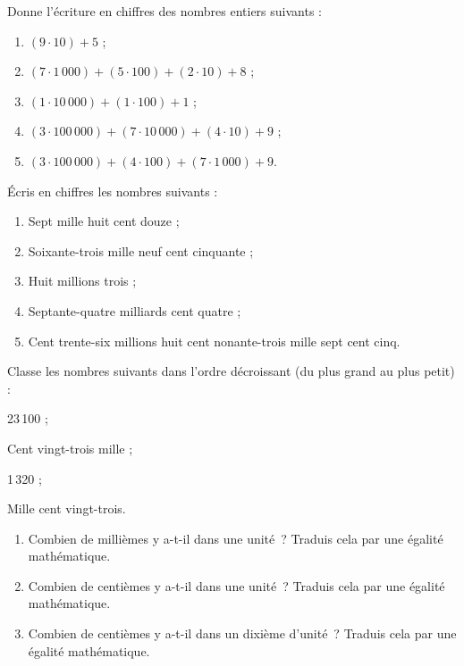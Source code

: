 \begin{exercice}
Donne l'écriture en chiffres des nombres entiers suivants :
\begin{enumerate}
 \item $(9 \cdot 10) + 5$ ;
 \item $(7 \cdot 1\,000) + (5 \cdot 100) + (2 \cdot 10) + 8$ ;
 \item $(1 \cdot 10\,000) + (1 \cdot 100) + 1$ ;
 \item  $(3 \cdot 100\,000) + (7 \cdot 10\,000) + (4 \cdot 10) + 9$ ;
 \item  $(3 \cdot 100\,000) + (4 \cdot 100) + (7 \cdot 1\,000) + 9$.
 \end{enumerate}
\end{exercice}


\begin{exercice}
Écris en chiffres les nombres suivants :
\begin{enumerate}
 \item Sept mille huit cent douze ;
 \item Soixante-trois mille neuf cent cinquante ;
 \item Huit millions trois ;
 \item Septante-quatre milliards cent quatre ;
 \item Cent trente-six millions huit cent nonante-trois mille sept cent cinq.
 \end{enumerate}
\end{exercice}

\vspace{1em}%

\begin{exercice}
Classe les nombres suivants dans l'ordre décroissant (du plus grand au plus petit) :
\begin{colitemize}{2}
 \item 23\,100 ;
 \item Cent vingt-trois mille ;
 \item 1\,320 ;
 \item Mille cent vingt-trois.
 \end{colitemize}
\end{exercice}



\begin{exercice}
\begin{enumerate}
 \item Combien de millièmes y a-t-il dans une unité ?
Traduis cela par une égalité mathématique.
 \item Combien de centièmes y a-t-il dans une unité ? Traduis cela par une égalité mathématique.
 \item Combien de centièmes y a-t-il dans un dixième d'unité ? Traduis cela par une égalité mathématique.
 \end{enumerate}
\end{exercice}


